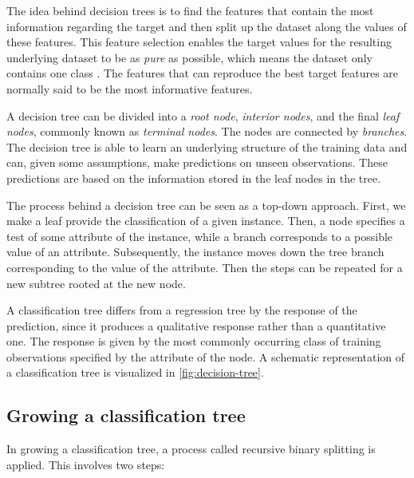 The idea behind decision trees is to find the features that contain the most information regarding the target and then split up the dataset along the values of these features. This feature selection enables the target values for the resulting underlying dataset to be as \textit{pure} as possible, which means the dataset only contains one class \cite{Murphy2012}. The features that can reproduce the best target features are normally said to be the most informative features.

A decision tree can be divided into a \textit{root node}, \textit{interior nodes}, and the final \textit{leaf nodes}, commonly known as \textit{terminal nodes}. The nodes are connected by \textit{branches}. The decision tree is able to learn an underlying structure of the training data and can, given some assumptions, make predictions on unseen observations. These predictions are based on the information stored in the leaf nodes in the tree.


\noindent The process behind a decision tree can be seen as a top-down approach. First, we make a leaf provide the classification of a given instance. Then, a node specifies a test of some attribute of the instance, while a branch corresponds to a possible value of an attribute. Subsequently, the instance moves down the tree branch corresponding to the value of the attribute. Then the steps can be repeated for a new subtree rooted at the new node.

A classification tree differs from a regression tree by the response of the prediction, since it produces a qualitative response rather than a quantitative one. The response is given by the most commonly occurring class of training observations specified by the attribute of the node. A schematic representation of a classification tree is visualized in \autoref{fig:decision-tree}. %

\subsection{Growing a classification tree}

In growing a classification tree, a process called recursive binary splitting is applied. This involves two steps:

